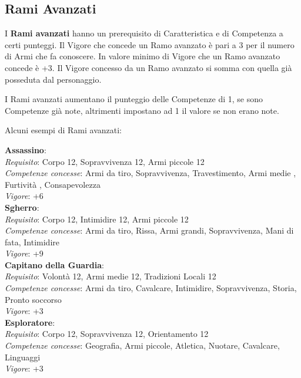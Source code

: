 \documentclass[12pt,a4paper,twoside,openany]{book}
\begin{document}
\begin{multicols}{2}	

\subsection{Rami Avanzati}

I \textbf{Rami avanzati} hanno un prerequisito di Caratteristica e di Competenza a certi punteggi.
Il Vigore che concede un Ramo avanzato è pari a 3 per il numero di Armi che fa conoscere. In valore minimo di Vigore che un Ramo avanzato concede è +3.
Il Vigore concesso da un Ramo avanzato si somma con quella già posseduta dal personaggio.

I Rami avanzati aumentano il punteggio delle Competenze di 1, se sono Competenze già note, altrimenti impostano ad 1 il valore se non erano note.

Alcuni esempi di Rami avanzati:\medskip

\textbf{Assassino}:\\
\textit{Requisito}: Corpo 12, Sopravvivenza 12, Armi piccole 12\\
\textit{Competenze concesse}: Armi da tiro, Sopravvivenza, Travestimento, Armi medie , Furtività , Consapevolezza\\
\textit{Vigore}: +6\\

\textbf{Sgherro}:\\
\textit{Requisito}: Corpo 12, Intimidire 12, Armi piccole 12\\
\textit{Competenze concesse}: Armi da tiro, Rissa, Armi grandi, Sopravvivenza, Mani di fata, Intimidire\\
\textit{Vigore}: +9\\

\textbf{Capitano della Guardia}:\\
\textit{Requisito}: Volontà 12, Armi medie 12, Tradizioni Locali 12\\
\textit{Competenze concesse}: Armi da tiro, Cavalcare, Intimidire, Sopravvivenza, Storia, Pronto soccorso\\
\textit{Vigore}: +3\\

\textbf{Esploratore}:\\
\textit{Requisito}: Corpo 12, Sopravvivenza 12, Orientamento 12\\
\textit{Competenze concesse}: Geografia, Armi piccole, Atletica, Nuotare, Cavalcare, Linguaggi\\
\textit{Vigore}: +3\\


\end{multicols}
\end{document}
